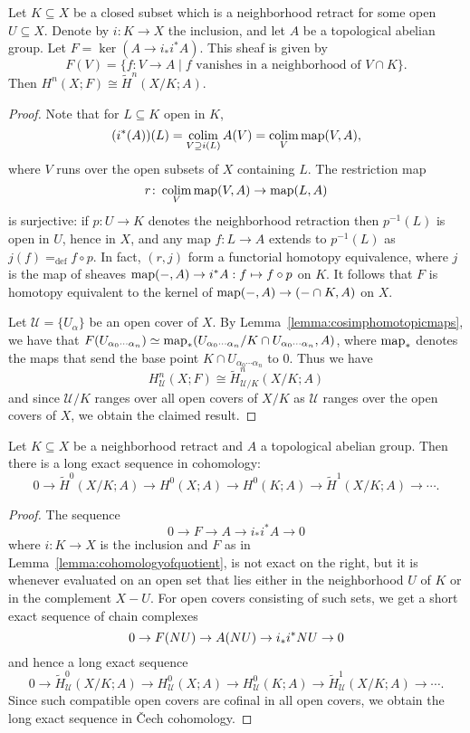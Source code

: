 \documentclass[a4paper,openany]{scrbook}
\newcommand{\nerve}{\mathcal N}
\begin{document}
\begin{lemma}\label{lemma:cohomologyofquotient}
Let $K \subseteq X$ be a closed subset which is a neighborhood retract for some open $U \subseteq X$. Denote by $i\colon K \to X$ the inclusion, and let $A$ be a topological abelian group. Let $F = \ker(A \to i_*i^*A)$. This sheaf is given by
\[
F(V) = \{f\colon V \to A \mid f \text{ vanishes in a neighborhood of $V \cap K$}\}.
\]
Then $H^n(X;F) \cong \tilde H^n(X/K;A)$.
\end{lemma}
\begin{proof}
Note that for $L \subseteq K$ open in $K$, 
\[
(i^*(A))(L) = \operatorname*{colim}_{V \supseteq i(L)} A(V) = \operatorname*{colim}_V \operatorname{map}(V,A),
\]
where $V$ runs over the open subsets of $X$ containing $L$. The restriction map
\[
r\colon \operatorname*{colim}_V \operatorname{map}(V,A) \to \operatorname{map}(L,A)
\]
is surjective: if $p\colon U \to K$ denotes the neighborhood retraction then $p^{-1}(L)$ is open in $U$, hence in $X$, and any map $f\colon L \to A$ extends to $p^{-1}(L)$ as $j(f) =_{\operatorname{def}} f\circ p$. In fact, $(r,j)$ form a functorial homotopy equivalence, where $j$ is the map of sheaves $\operatorname{map}(-,A) \to i^*A: f \mapsto f \circ p$ on $K$. It follows that $F$ is homotopy equivalent to the kernel of $\operatorname{map}(-,A) \to (- \cap K, A)$ on $X$.

Let $\mathcal U = \{U_\alpha\}$ be an open cover of $X$. By Lemma~\ref{lemma:cosimphomotopicmaps}, we have that $F(U_{\alpha_0\cdots\alpha_n}) \simeq \operatorname{map}_*(U_{\alpha_0\cdots\alpha_n}/K \cap U_{\alpha_0\cdots\alpha_n},A)$, where $\operatorname{map}_*$ denotes the maps that send the base point $K \cap U_{\alpha_0\cdots\alpha_n}$ to $0$. Thus we have
\[
H^n_{\mathcal U}(X;F) \cong \tilde H^n_{\mathcal U/K}(X/K;A)
\]
and since $\mathcal U/K$ ranges over all open covers of $X/K$ as $\mathcal U$ ranges over the open covers of $X$, we obtain the claimed result.
\end{proof} 

\begin{corollary}\label{cor:sesforspaces}
Let $K \subseteq X$ be a neighborhood retract and $A$ a topological abelian group. Then there is a long exact sequence in cohomology:
\[
0 \to \tilde H^0(X/K;A) \to H^0(X;A) \to H^0(K;A) \to \tilde H^1(X/K;A) \to \cdots.
\]
\end{corollary}
\begin{proof}
The sequence
\[
0 \to F \to A \to i_*i^*A \to 0
\]
where $i \colon K \to X$ is the inclusion and $F$ as in Lemma~\ref{lemma:cohomologyofquotient}, is not exact on the right, but it is whenever evaluated on an open set that lies either in the neighborhood $U$ of $K$ or in the complement $X-U$. For open covers consisting of such sets, we get a short exact sequence of chain complexes
\[
0 \to F(\mathcal \nerve U) \to A(\mathcal \nerve U) \to i_*i^*\mathcal \nerve U \to 0
\]
and hence a long exact sequence
\[
0 \to \tilde H^0_{\mathcal U}(X/K;A) \to H^0_{\mathcal U}(X;A) \to H^0_{\mathcal U}(K;A) \to \tilde H^1_{\mathcal U}(X/K;A) \to \cdots.
\]
Since such compatible open covers are cofinal in all open covers, we obtain the long exact sequence in \v Cech cohomology.
\end{proof}
\end{document}
